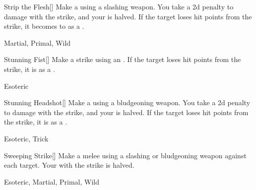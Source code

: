 \lowercase{\hypertarget{maneuver:Strip the Flesh}{}}\label{maneuver:Strip the Flesh}
\hypertarget{maneuver:Strip the Flesh}{}
\begin{freeability}[Rank 1]{Strip the Flesh}[]
Make a  using a slashing weapon.
You take a \minus2d penalty to damage with the strike, and your  is halved.
If the target loses hit points from the strike, it becomes  to  as a .


 Martial, Primal, Wild
\end{freeability}
\vspace{0.25em}



\lowercase{\hypertarget{maneuver:Stunning Fist}{}}\label{maneuver:Stunning Fist}
\hypertarget{maneuver:Stunning Fist}{}
\begin{freeability}[Rank 1]{Stunning Fist}[]
Make a strike using an .
If the target loses hit points from the strike, it is  as a .


 Esoteric
\end{freeability}
\vspace{0.25em}



\lowercase{\hypertarget{maneuver:Stunning Headshot}{}}\label{maneuver:Stunning Headshot}
\hypertarget{maneuver:Stunning Headshot}{}
\begin{freeability}[Rank 1]{Stunning Headshot}[]
Make a  using a bludgeoning weapon.
You take a \minus2d penalty to damage with the strike, and your  is halved.
If the target loses hit points from the strike, it is  as a .


 Esoteric, Trick
\end{freeability}
\vspace{0.25em}



\lowercase{\hypertarget{maneuver:Sweeping Strike}{}}\label{maneuver:Sweeping Strike}
\hypertarget{maneuver:Sweeping Strike}{}
\begin{freeability}[Rank 1]{Sweeping Strike}[]
Make a melee  using a slashing or bludgeoning weapon against each target.
Your  with the strike is halved.


 Esoteric, Martial, Primal, Wild
\end{freeability}
\vspace{0.25em}


